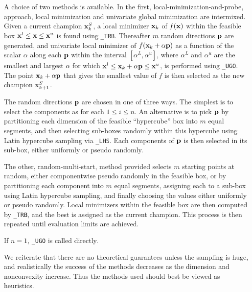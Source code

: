 \documentclass{galahad}
\begin{document}
\galmethod
A choice of two methods is available.
In the first, local-minimization-and-probe, approach, local minimization
and univariate global minimization are intermixed. Given a current
champion ${\mathbf{x}}^S_k$, a local minimizer ${\mathbf{x}}_k$ of $f({\mathbf{x}})$ within the
feasible box ${\mathbf{x}}^l \leq {\mathbf{x}} \leq {\mathbf{x}}^u$ is found using
{\tt \libraryname\_TRB}.
Thereafter $m$ random directions ${\mathbf{p}}$ are generated, and univariate
local minimizer of $f({\mathbf{x}}_k + \alpha {\mathbf{p}})$ as a function of the scalar
$\alpha$ along each ${\mathbf{p}}$ within the interval $[\alpha^L,\alpha^u]$,
where $\alpha^L$ and $\alpha^u$ are the smallest and largest $\alpha$
for which ${\mathbf{x}}^l \leq {\mathbf{x}}_k + \alpha {\mathbf{p}} \leq {\mathbf{x}}^u$,
is performed using {\tt \libraryname\_UGO}. The point ${\mathbf{x}}_k + \alpha {\mathbf{p}}$
that gives the smallest value of $f$ is then selected as the new champion
${\mathbf{x}}^S_{k+1}$.

The random directions ${\mathbf{p}}$ are chosen in one of three ways. The simplest is
to select the components as
for each $1 \leq i \leq n$. An alternative is to
pick ${\mathbf{p}}$ by partitioning each dimension of the feasible ``hypercube'' box
into $m$ equal segments, and then selecting sub-boxes
randomly within this hypercube using Latin hypercube sampling via
{\tt \libraryname\_LHS}.
Each components of ${\mathbf{p}}$ is then selected in its sub-box, either uniformly
or pseudo randomly.

The other, random-multi-start, method provided selects $m$ starting points
at random, either componentwise pseudo randomly in the feasible box,
or by partitioning each component into $m$ equal segments, assigning each to
a sub-box using Latin hypercube sampling, and finally choosing the
values either uniformly or pseudo randomly. Local minimizers within the
feasible box are then computed by {\tt \libraryname\_TRB}, and
the best is assigned as the current champion. This process is then
repeated until evaluation limits are achieved.

If $n=1$, {\tt \libraryname\_UGO} is called directly.

We reiterate that there are no theoretical guarantees unless the sampling
is huge, and realistically the success of the methods decreases as the
dimension and nonconvexity increase. Thus the methods used should best
be viewed as heuristics.
\end{document}
